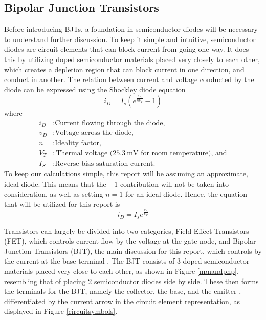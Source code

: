 \documentclass[11pt]{report}
\begin{document}
\subsection{Bipolar Junction Transistors}
Before introducing BJTs, a foundation in semiconductor diodes will be necessary to understand further discussion. To keep it simple and intuitive, semiconductor diodes are circuit elements that can block current from going one way. It does this by utilizing doped semiconductor materials placed very closely to each other, which creates a depletion region that can block current in one direction, and conduct in another. The relation between current and voltage conducted by the diode can be expressed using the Shockley diode equation
\begin{equation}
	i_D = I_s\left(e^{\frac{v_D}{nV_T}}-1\right)
\end{equation}
where
\begin{align*}
	i_D&: \text{Current flowing through the diode,} \\
	v_D&: \text{Voltage across the diode,} \\
	n&: \text{Ideality factor,} \\
	V_T&: \text{Thermal voltage ($\SI{25.3}{\milli\volt}$ for room temperature), and} \\
	I_S&: \text{Reverse-bias saturation current.}
\end{align*}
To keep our calculations simple, this report will be assuming an approximate, ideal diode. This means that the $-1$ contribution will not be taken into consideration, as well as setting $n=1$ for an ideal diode. Hence, the equation that will be utilized for this report is
\begin{equation}
	i_D = I_se^{\frac{v_D}{V_T}}
\end{equation}

Transistors can largely be divided into two categories, Field-Effect Transistors (FET), which controls current flow by the voltage at the gate node, and Bipolar Junction Transistors (BJT), the main discussion for this report, which controls by the current at the base terminal \autocite{subramaniNanoelectronicApplicationsCarbon2023}. The BJT consists of 3 doped semiconductor materials placed very close to each other, as shown in Figure \ref{npnandpnp}, resembling that of placing 2 semiconductor diodes side by side. These then forms the terminals for the BJT, namely the collector, the base, and the emitter \autocite{subramaniNanoelectronicApplicationsCarbon2023}, differentiated by the current arrow in the circuit element representation, as displayed in Figure \ref{circuitsymbols}.
\end{document}
